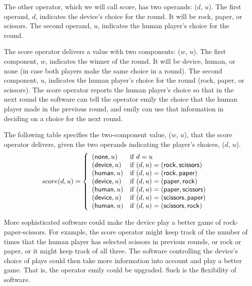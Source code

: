 The other operator, which we will call \textsf{score},
has two operands: ($d$, $u$).
The first operand, $d$,
indicates the  device's choice for the round.
It will be \textsf{rock}, \textsf{paper}, or \textsf{scissors}.
The second operand, $u$, indicates the human player's choice for the round.

The \textsf{score} operator delivers a value with two components: ($w$, $u$).
The first component, $w$, indicates the winner of the round.
It will be \textsf{device}, \textsf{human}, or \textsf{none}
(in case both players make the same choice in a round).
The second component, $u$, indicates the human player's choice for the round
(\textsf{rock}, \textsf{paper}, or \textsf{scissors}).
The \textsf{score} operator reports the human player's choice so that
in the next round the software
can tell the operator \textsf{emily} 
the choice that the human player made in the previous round,
and \textsf{emily} can use that information in deciding on a choice
for the next round.

The following table specifies
the two-component value, ($w$, $u$), that the \textsf{score} operator
delivers, given the two operands indicating the player's choices, ($d$, $u$).
\begin{displaymath}
score(d,u) =
   \left\{
        \begin{array}{ll}
        (\mbox{\textsf{none}}, u)   & \mbox{if } d = u \\
        (\mbox{\textsf{device}}, u) & \mbox{if } (d,u) = (\mbox{\textsf{rock}}, \mbox{\textsf{scissors}}) \\
        (\mbox{\textsf{human}}, u)  & \mbox{if } (d,u) = (\mbox{\textsf{rock}}, \mbox{\textsf{paper}}) \\
        (\mbox{\textsf{device}}, u) & \mbox{if } (d,u) = (\mbox{\textsf{paper}}, \mbox{\textsf{rock}}) \\
        (\mbox{\textsf{human}}, u)  & \mbox{if } (d,u) = (\mbox{\textsf{paper}}, \mbox{\textsf{scissors}}) \\
        (\mbox{\textsf{device}}, u) & \mbox{if } (d,u) = (\mbox{\textsf{scissors}}, \mbox{\textsf{paper}}) \\
        (\mbox{\textsf{human}}, u)  & \mbox{if } (d,u) = (\mbox{\textsf{scissors}}, \mbox{\textsf{rock}}) \\ 
        \end{array}
   \right.
\end{displaymath}

More sophisticated software could make the device play a better game of
rock-paper-scissors.
For example, the \textsf{score} operator might
keep track of the number of times that the human player has selected scissors
in previous rounds, or rock or paper, or it might keep track of all three.
The software controlling the device's choice of plays could
then take more information into account and play a better game.
That is, the operator \textsf{emily} could be upgraded.
Such is the flexibility of software.

